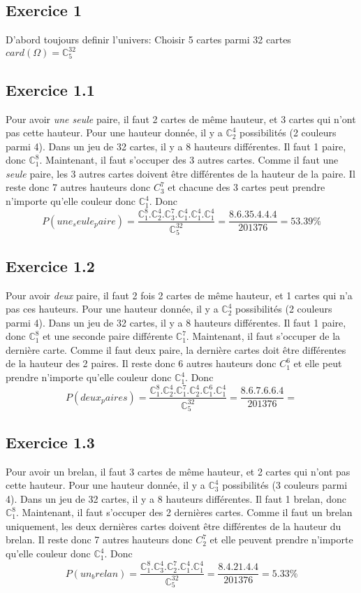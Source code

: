 \documentclass[]{book}
\theoremstyle{definition}
\newcommand{\bb}[1]{\mathbb{#1}}
\newcommand{\C}{\bb{C}}
\begin{document}
\subsection*{Exercice 1}
D'abord toujours definir l'univers: Choisir 5 cartes parmi 32 cartes $card(\Omega)=\C_5^32$

\subsection*{Exercice 1.1}
Pour avoir \emph{une seule} paire, il faut 2 cartes de m\^eme hauteur, et 3 cartes qui n'ont pas cette hauteur. Pour une hauteur donn\'ee, il y a $\C_2^4$ possibilit\'es (2 couleurs parmi 4). Dans un jeu de 32 cartes, il y a 8 hauteurs diff\'erentes. Il faut 1 paire, donc $\C_1^8$. Maintenant, il faut s'occuper des 3 autres cartes. Comme il faut une \emph{seule} paire, les 3 autres cartes doivent \^etre diff\'erentes de la hauteur de la paire. Il reste donc 7 autres hauteurs donc $C_3^7$ et chacune des 3 cartes peut prendre n'importe qu'elle couleur donc $\C_1^4$. Donc
$$P(une_seule_paire) = \frac{\C_1^8.\C_2^4.\C_3^7.\C_1^4.\C_1^4.\C_1^4}{\C_5^{32}} = \frac{8.6.35.4.4.4}{201376} = 53.39\%$$

\subsection*{Exercice 1.2}
Pour avoir \emph{deux} paire, il faut 2 fois 2 cartes de m\^eme hauteur, et 1 cartes qui n'a pas ces hauteurs. Pour une hauteur donn\'ee, il y a $\C_2^4$ possibilit\'es (2 couleurs parmi 4). Dans un jeu de 32 cartes, il y a 8 hauteurs diff\'erentes. Il faut 1 paire, donc $\C_1^8$ et une seconde paire diff\'erente $\C_1^7$. Maintenant, il faut s'occuper de la derni\`ere carte. Comme il faut deux paire, la derni\`ere cartes doit \^etre diff\'erentes de la hauteur des 2 paires. Il reste donc 6 autres hauteurs donc $C_1^6$ et elle peut prendre n'importe qu'elle couleur donc $\C_1^4$. Donc
$$P(deux_paires) = \frac{\C_1^8.\C_2^4.\C_1^7.\C_2^4.\C_1^6.\C_1^4}{\C_5^{32}} = \frac{8.6.7.6.6.4}{201376} = $$

\subsection*{Exercice 1.3}
Pour avoir un brelan, il faut 3 cartes de m\^eme hauteur, et 2 cartes qui n'ont pas cette hauteur. Pour une hauteur donn\'ee, il y a $\C_3^4$ possibilit\'es (3 couleurs parmi 4). Dans un jeu de 32 cartes, il y a 8 hauteurs diff\'erentes. Il faut 1 brelan, donc $\C_1^8$. Maintenant, il faut s'occuper des 2 derni\`eres cartes. Comme il faut un brelan uniquement, les deux derni\`eres cartes doivent \^etre diff\'erentes de la hauteur du brelan. Il reste donc 7 autres hauteurs donc $C_2^7$ et elle peuvent prendre n'importe qu'elle couleur donc $\C_1^4$. Donc
$$P(un_brelan) = \frac{\C_1^8.\C_3^4.\C_2^7.\C_1^4.\C_1^4}{\C_5^{32}} = \frac{8.4.21.4.4}{201376} = 5.33\%$$
\end{document}
